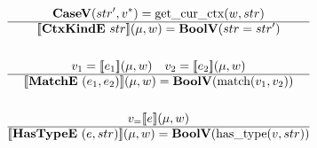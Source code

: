 \begin{gather*}
%
\newline \\
  \casev (str', \seq v) = \getcurctx(w, str) \\
  \hline
  \sem{\ctxkinde ~ str}(\mu, w) = \boolv (str = str') \\
%
\newline \\
  v_1 = \sem{e_1}(\mu, w) \quad
  v_2 = \sem{e_2}(\mu, w) \\
  \hline
  \sem{\matche ~ (e_1, e_2)}(\mu, w) = \boolv (\match(v_1, v_2)) \\
%
\newline \\
  v_= \sem{e}(\mu, w) \\
  \hline
  \sem{\hastypee ~ (e, str)}(\mu, w) = \boolv (\hastype(v, str)) \\
\end{gather*}





